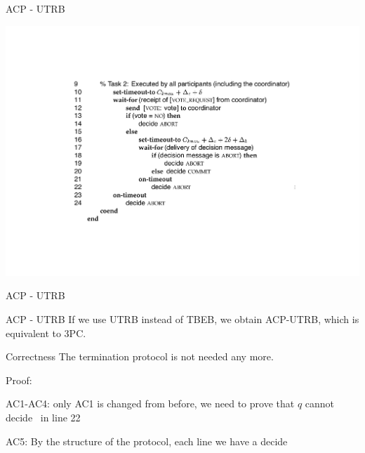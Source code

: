 \begin{frame}{ACP - UTRB}

\includegraphics[width=\textwidth]{alg3.pdf}

\end{frame}

\begin{frame}{ACP - UTRB}

\begin{block}{ACP - UTRB}	
If we use UTRB instead of TBEB, we obtain ACP-UTRB, which is equivalent to 3PC.
\end{block}

\bigskip

\bigskip
\begin{block}{Correctness}
The termination protocol is not needed any more.

\smallskip
Proof:
\BI
\item AC1-AC4: only AC1 is changed from before, we need to prove that $q$ cannot decide \ABORT\ in line 22
\item AC5: By the structure of the protocol, each line we have a decide
\EI
\end{block}
 
\end{frame}
 
  

